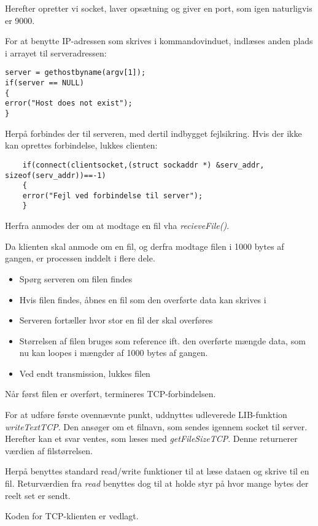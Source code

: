 Herefter opretter vi socket, laver opsætning og giver en port, som igen naturligvis er 9000. 

For at benytte IP-adressen som skrives i kommandovinduet, indlæses anden plads i arrayet til serveradressen:

\begin{lstlisting}
server = gethostbyname(argv[1]);
if(server == NULL)
{
error("Host does not exist");
}

\end{lstlisting}

Herpå forbindes der til serveren, med dertil indbygget fejlsikring. Hvis der ikke kan oprettes forbindelse, lukkes clienten:

\begin{lstlisting}
	if(connect(clientsocket,(struct sockaddr *) &serv_addr, sizeof(serv_addr))==-1)
	{
	error("Fejl ved forbindelse til server");
	}
\end{lstlisting}

Herfra anmodes der om at modtage en fil vha \textit{recieveFile()}.

Da klienten skal anmode om en fil, og derfra modtage filen i 1000 bytes af gangen, er processen inddelt i flere dele.

\begin{itemize}
	\item Spørg serveren om filen findes
	\item Hvis filen findes, åbnes en fil som den overførte data kan skrives i
	\item Serveren fortæller hvor stor en fil der skal overføres
	\item Størrelsen af filen bruges som reference ift. den overførte mængde data, som nu kan loopes i mængder af 1000 bytes af gangen. 
	\item Ved endt transmission, lukkes filen
\end{itemize}

Når først filen er overført, termineres TCP-forbindelsen. 

For at udføre første ovennævnte punkt, uddnyttes udleverede LIB-funktion \textit{writeTextTCP}. Den ansøger om et filnavn, som sendes igennem socket til server. 
Herefter kan et svar ventes, som læses med \textit{getFileSizeTCP}. Denne returnerer værdien af filstørrelsen. 

Herpå benyttes standard read/write funktioner til at læse dataen og skrive til en fil. 
Returværdien fra \textit{read} benyttes dog til at holde styr på hvor mange bytes der reelt set er sendt. 

Koden for TCP-klienten er vedlagt. 
